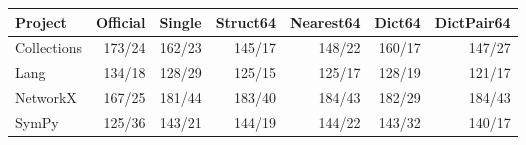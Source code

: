 \begin{tabular}{lrrrrrr}
\toprule
Project & Official & Single & Struct64 & Nearest64 & Dict64 & DictPair64 \\
\midrule
Collections & 173/24 & 162/23 & 145/17 & 148/22 & 160/17 & 147/27 \\
Lang & 134/18 & 128/29 & 125/15 & 125/17 & 128/19 & 121/17 \\
NetworkX & 167/25 & 181/44 & 183/40 & 184/43 & 182/29 & 184/43 \\
SymPy & 125/36 & 143/21 & 144/19 & 144/22 & 143/32 & 140/17 \\
\bottomrule
\end{tabular}

